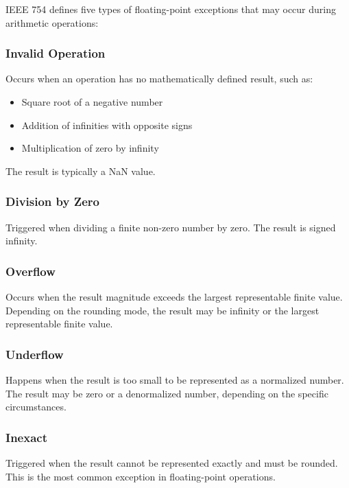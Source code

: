 IEEE 754 defines five types of floating-point exceptions that may occur during arithmetic operations:

\subsubsection{Invalid Operation}
\label{subsubsec:invalid_operation}

Occurs when an operation has no mathematically defined result, such as:
\begin{itemize}
\item Square root of a negative number
\item Addition of infinities with opposite signs
\item Multiplication of zero by infinity
\end{itemize}

The result is typically a NaN value.

\subsubsection{Division by Zero}
\label{subsubsec:division_by_zero}

Triggered when dividing a finite non-zero number by zero. The result is signed infinity.

\subsubsection{Overflow}
\label{subsubsec:overflow}

Occurs when the result magnitude exceeds the largest representable finite value. Depending on the rounding mode, the result may be infinity or the largest representable finite value.

\subsubsection{Underflow}
\label{subsubsec:underflow}

Happens when the result is too small to be represented as a normalized number. The result may be zero or a denormalized number, depending on the specific circumstances.

\subsubsection{Inexact}
\label{subsubsec:inexact}

Triggered when the result cannot be represented exactly and must be rounded. This is the most common exception in floating-point operations.

